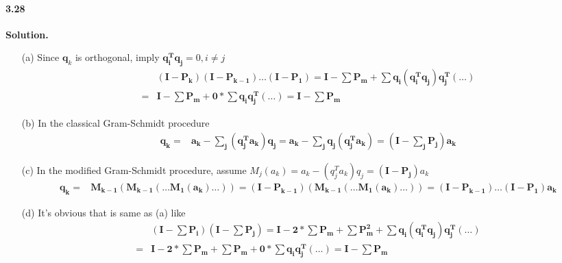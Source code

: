 \documentclass[a4paper]{book}
\newenvironment{solution}%
{\noindent\textbf{Solution.}}%
{\qedhere}
\numberwithin{equation}{chapter}
\theoremstyle{definition}
\begin{document}
\paragraph*{3.28 }
\begin{solution}
    \begin{itemize}
        \item [(a)] Since $\bm q_k$ is orthogonal, imply $\bm {q_i^T q_j} = 0, i \neq j$
        \begin{align*}
            &\bm{(I - P_k)(I - P_{k-1})\ldots(I - P_{1})}
            =\bm{I - \sum P_m + \sum q_i (q_i^T q_j) q_j^T (\ldots)} \\
            =&\bm{I - \sum P_m + 0 * \sum q_i q_j^T (\ldots)}
            =\bm{I - \sum P_m}
        \end{align*}
        
        \item [(b)] In the classical Gram-Schmidt procedure 
        \begin{align*}
            \bm {q_k} =& \bm{a_k - \sum_j (q_j^T a_k) q_j}
            =\bm { a_k - \sum_j q_j (q_j^T a_k)} 
            =\bm { (I - \sum_j P_j)a_k}
        \end{align*}

        \item [(c)] In the modified Gram-Schmidt procedure,
        assume $M_j(a_k) = a_k - (q_j^T a_k)q_j = \bm{(I - P_j)}a_k$ 
        \begin{align*}
            \bm {q_k} =& \bm{M_{k -1}(M_{k - 1}( \ldots M_1(a_k) \ldots)) }
            =\bm {(I - P_{k - 1})(M_{k - 1}( \ldots M_1(a_k) \ldots))} 
            =\bm { (I - P_{k - 1})\ldots (I - P_1) a_k}
        \end{align*}

        \item [(d)] It's obvious that is same as (a) like
        \begin{align*}
            &\bm{(I - \sum P_i)(I - \sum P_{j})}
            =\bm{I - 2* \sum P_m +  \sum P_{m}^2 + \sum q_i (q_i^T q_j) q_j^T (\ldots)} \\
            =&\bm{I - 2* \sum P_m + \sum P_{m} + 0 * \sum q_i q_j^T (\ldots)}
            =\bm{I - \sum P_m}
        \end{align*}
    \end{itemize}
\end{solution}
\end{document}
